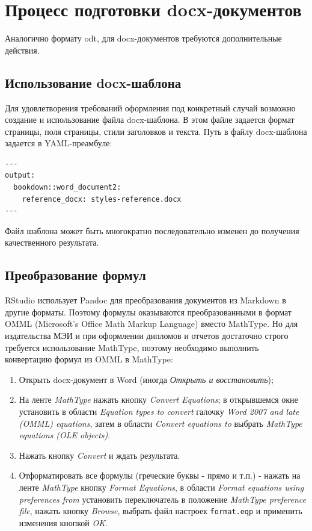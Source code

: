 \documentclass[
  a4paper,
]{book}
\providecommand{\tightlist}{%
  \setlength{\itemsep}{0pt}\setlength{\parskip}{0pt}}
\theoremstyle{definition}
\theoremstyle{definition}
\theoremstyle{definition}
\theoremstyle{definition}
\theoremstyle{remark}
\begin{document}
\hypertarget{authoring-docx}{%
\section{Процесс подготовки docx-документов}\label{authoring-docx}}

Аналогично формату odt, для docx-документов требуются дополнительные действия.

\hypertarget{authoring-docx-template}{%
\subsection{Использование docx-шаблона}\label{authoring-docx-template}}

Для удовлетворения требований оформления под конкретный случай возможно создание и использование файла docx-шаблона. В этом файле задается формат страницы, поля страницы, стили заголовков и текста. Путь в файлу docx-шаблона задается в YAML-преамбуле:

\begin{verbatim}
---
output:
  bookdown::word_document2:
    reference_docx: styles-reference.docx
---
\end{verbatim}

Файл шаблона может быть многократно последовательно изменен до получения качественного результата.

\hypertarget{authoring-docx-math}{%
\subsection{Преобразование формул}\label{authoring-docx-math}}

RStudio использует Pandoc для преобразования документов из Markdown в другие форматы. Поэтому формулы оказываются преобразованными в формат OMML (Microsoft's Office Math Markup Language) вместо MathType. Но для издательства МЭИ и при оформлении дипломов и отчетов достаточно строго требуется использование MathType, поэтому необходимо выполнить конвертацию формул из OMML в MathType:

\begin{enumerate}
\def\labelenumi{\arabic{enumi}.}
\tightlist
\item
  Открыть docx-документ в Word (иногда \emph{Открыть и восстановить});
\item
  На ленте \emph{MathType} нажать кнопку \emph{Convert Equations};
  в открывшемся окне установить в области \emph{Equation types to convert} галочку \emph{Word 2007 and late (OMML) equations}, затем в области \emph{Convert equations to} выбрать \emph{MathType equations (OLE objects)}.
\item
  Нажать кнопку \emph{Convert} и ждать результата.
\item
  Отформатировать все формулы (греческие буквы - прямо и т.п.) - нажать на ленте \emph{MathType} кнопку \emph{Format Equations}, в области \emph{Format equations using preferences from} установить переключатель в положение \emph{MathType preference file}, нажать кнопку \emph{Browse}, выбрать файл настроек \texttt{format.eqp} и применить изменения кнопкой \emph{OK}.
\end{enumerate}
\end{document}
